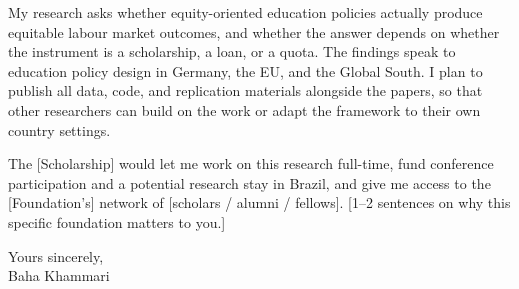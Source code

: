 \documentclass[a4paper,11pt]{article}
\begin{document}


My research asks whether equity-oriented education policies actually produce equitable labour market outcomes, and whether the answer depends on whether the instrument is a scholarship, a loan, or a quota. The findings speak to education policy design in Germany, the EU, and the Global South. I plan to publish all data, code, and replication materials alongside the papers, so that other researchers can build on the work or adapt the framework to their own country settings.



The [Scholarship] would let me work on this research full-time, fund conference participation and a potential research stay in Brazil, and give me access to the [Foundation's] network of [scholars / alumni / fellows]. [1--2 sentences on why this specific foundation matters to you.]

\vspace{8pt}
\noindent Yours sincerely, \\
Baha Khammari
\end{document}
